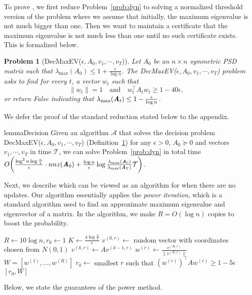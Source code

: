 \documentclass[11pt]{article}
\newtheorem{problem}[theorem]{Problem}
\let\originalleft\left
\let\originalright\right
\renewcommand{\left}{\mathopen{}\mathclose\bgroup\originalleft}
\renewcommand{\right}{\aftergroup\egroup\originalright}
\newcommand\vv{\boldsymbol{\mathit{v}}}
\newcommand\ww{\boldsymbol{\mathit{w}}}
\renewcommand\AA{\boldsymbol{\mathit{A}}}
\newcommand\WW{\boldsymbol{\mathit{W}}}
\begin{document}
To prove , we first reduce Problem~\ref{prob:dyn} to solving a normalized threshold version of the problem where we assume that initially, the maximum eigenvalue is not much bigger than one. Then we want to maintain a certificate that 
the maximum eigenvalue is not much less than one until no such certificate exists. This is formalized below.
\begin{problem}[DecMaxEV($\epsilon,\AA_0,\vv_1,\cdots,\vv_T$)]\label{def:DecMaxEval} Let $\AA_0$ be an $n\times n$ symmetric PSD matrix such that $ \lambda_{\max}(\AA_0) \leq 1 + \frac{\epsilon}{\log n}$. The {\sc DecMaxEV}($\epsilon,\AA_0,\vv_1,\cdots,\vv_T$) problem asks to find for every $t$, a vector $\ww_t$ such that 
\[
\|\ww_t\| = 1 \quad \text{and} \quad \ww_t^{\top}\AA_t \ww_t \geq 1-40\epsilon,
\]
or return {\sc False} indicating that $\lambda_{\max}(\AA_t)\le 1- \frac{\eps}{\log n}$.
\end{problem} 
We defer the proof of the standard reduction stated below to the appendix.
\begin{restatable}{lemma}{Decision}\label{lem:Decision}
Given an algorithm $\mathcal{A}$ that solves the decision problem {\sc DecMaxEV}($\epsilon,\AA_0,\vv_1,\cdots,\vv_T$) (Definition~\ref{def:DecMaxEval}) for any $\epsilon>0$, $\AA_0 \succeq 0$ and vectors $\vv_1,\cdots,\vv_T$ in time $\mathcal{T}$, we can solve Problem~\ref{prob:dyn} in total time $O\left(\frac{\log^2 n\log\frac{n}{\epsilon}}{\epsilon}\cdot nnz(\AA_0) + \frac{\log n}{\epsilon}\log \frac{\lambda_{\max}(\AA_0)}{\lambda_{\max}(\AA_T)}\mathcal{T}\right)$.
\end{restatable}
Next, we describe  which can be viewed as an algorithm for  when there are no updates. 
Our algorithm essentially applies the {\it power iteration}, which is a standard algorithm used to find an approximate maximum eigenvalue and eigenvector of a matrix. In the algorithm, we make $R = O(\log n)$ copies to boost the probability.
\begin{algorithm}
\caption{{\sc DecMaxEV} with no update}\label{alg:PowerMethod}
 \begin{algorithmic}[1]
\Procedure{PowerMethod}{$\epsilon, \AA$}
\State $R \leftarrow 10\log n, r_0 \leftarrow 1$
\State $K \leftarrow \frac{4\log \frac{n}{\epsilon}}{\epsilon}$
\State $\vv^{(0,r)} \leftarrow $ random vector with coordinates chosen from $N(0,1)$\label{algline:randomInit}
\State $\vv^{(k,r)}\leftarrow \AA\vv^{(k-1,r)}$
\EndFor
\State $\ww^{(r)} \leftarrow \frac{\vv^{(K,r)}}{\|\vv^{(K,r)}\|}$ 
\EndFor
\State $\WW = [\ww^{(1)},\dots,\ww^{(R)}]$\label{line:before case}
\If{ $(\ww^{(r)})^{\top}\AA\ww^{(r)} < 1-\epsilon$ for all $r\le R$}\label{line: if all w 1-eps}
\State {}
\Else
\State $r_0\leftarrow$ smallest $r$ such that $(\ww^{(r)})^{\top}\AA\ww^{(r)} \geq 1-5\epsilon$
\State \Return $[r_0,\WW]$
\EndIf
\EndProcedure 
 \end{algorithmic}
\end{algorithm}
Below, we state the guarantees of the power method.
\end{document}
